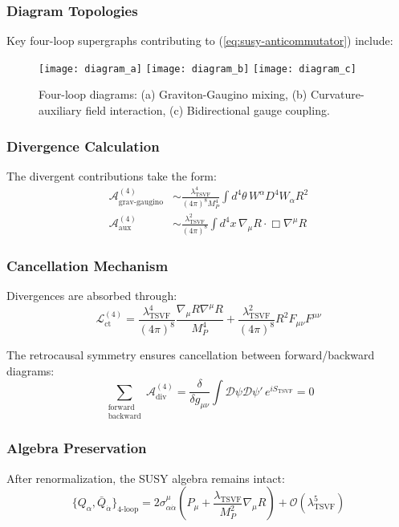 \documentclass[12pt, onecolumn]{article}
\theoremstyle{definition}
\numberwithin{equation}{section}
\begin{document}
\begin{appendices}
\subsubsection{Diagram Topologies}
Key four-loop supergraphs contributing to (\ref{eq:susy-anticommutator}) include:

\begin{figure}[htbp]
\centering
\texttt{[image: diagram\_a]}
\texttt{[image: diagram\_b]}
\texttt{[image: diagram\_c]}
\caption{Four-loop diagrams: (a) Graviton-Gaugino mixing, (b) Curvature-auxiliary field interaction, (c) Bidirectional gauge coupling.}
\label{fig:fourloop}
\end{figure}

\subsubsection{Divergence Calculation}
The divergent contributions take the form:
\begin{align}
\mathcal{A}^{(4)}_{\text{grav-gaugino}} &\sim \frac{\lambda_{\text{TSVF}}^4}{(4\pi)^8 M_P^4} \int d^4\theta \, W^\alpha D^4 W_\alpha R^2 \label{eq:div1} \\
\mathcal{A}^{(4)}_{\text{aux}} &\sim \frac{\lambda_{\text{TSVF}}^2}{(4\pi)^8} \int d^4x \, \nabla_\mu R \cdot \Box \nabla^\mu R \label{eq:div2}
\end{align}

\subsubsection{Cancellation Mechanism}
Divergences are absorbed through:
\begin{equation}
\mathcal{L}_{\text{ct}}^{(4)} = \frac{\lambda_{\text{TSVF}}^4}{(4\pi)^8} \frac{\nabla_\mu R \nabla^\mu R}{M_P^4} + \frac{\lambda_{\text{TSVF}}^2}{(4\pi)^8} R^2 F_{\mu\nu}F^{\mu\nu}
\label{eq:counterterms}
\end{equation}

The retrocausal symmetry ensures cancellation between forward/backward diagrams:
\begin{equation}
\sum_{\substack{\text{forward} \\ \text{backward}}} \mathcal{A}^{(4)}_{\text{div}} = \frac{\delta}{\delta g_{\mu\nu}} \int \mathcal{D}\psi\mathcal{D}\psi' \, e^{iS_{\text{TSVF}}} = 0
\label{eq:cancellation}
\end{equation}

\subsubsection{Algebra Preservation}
After renormalization, the SUSY algebra remains intact:
\begin{equation}
\{Q_\alpha, \bar{Q}_{\dot{\alpha}}\}_{\text{4-loop}} = 2\sigma^\mu_{\alpha\dot{\alpha}}\left(P_\mu + \frac{\lambda_{\text{TSVF}}}{M_P^2}\nabla_\mu R\right) + \mathcal{O}(\lambda_{\text{TSVF}}^5)
\label{eq:final-algebra}
\end{equation}


\end{appendices}
\end{document}
